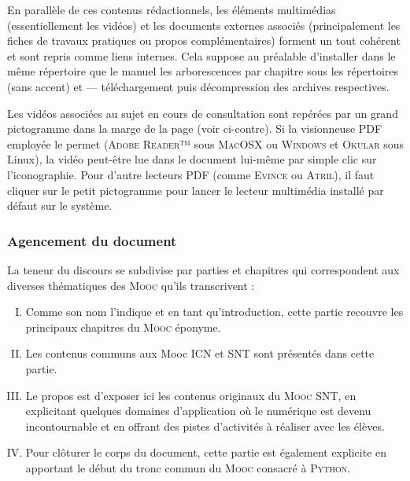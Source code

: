 En parallèle de ces contenus rédactionnels, les éléments multimédias (essentiellement les vidéos) et les documents externes associés (principalement les fiches de travaux pratiques ou propos complémentaires) forment un tout cohérent et sont repris comme liens internes. Cela suppose au préalable d'installer dans le même répertoire que le manuel les arborescences par chapitre sous les répertoires  (sans accent) et  --- téléchargement puis décompression des archives respectives.

Les vidéos associées au sujet en cours de consultation sont repérées par un grand pictogramme dans la marge de la page (voir ci-contre). Si la visionneuse PDF employée le permet (\textsc{Adobe Reader}™ sous \textsc{MacOSX} ou \textsc{Windows} et \textsc{Okular} sous Linux), la vidéo peut-être lue dans le document lui-même par simple clic sur l'iconographie. Pour d'autre lecteurs PDF (comme \textsc{Evince} ou \textsc{Atril}), il faut cliquer sur le petit pictogramme \faTv{} pour lancer le lecteur multimédia installé par défaut sur le système.

\subsubsection*{Agencement du document}

La teneur du discours se subdivise par parties et chapitres qui correspondent aux diverses thématiques des \textsc{Mooc} qu'ils transcrivent :
\begin{enumerate}[I.]
\item {} Comme son nom l'indique et en tant qu'introduction, cette partie recouvre les principaux chapitres du \textsc{Mooc} éponyme.
\item {} Les contenus communs aux Mooc ICN et SNT sont présentés dans cette partie.
\item {}  Le propos est d'exposer ici les contenus originaux du \textsc{Mooc} SNT, en explicitant quelques domaines d'application où le numérique est devenu incontournable et en offrant des pistes d'activités à réaliser avec les élèves.
\item {} Pour clôturer le corps du document, cette partie est également explicite en apportant le début du tronc commun du \textsc{Mooc} consacré à \textsc{Python}.
\end{enumerate}

